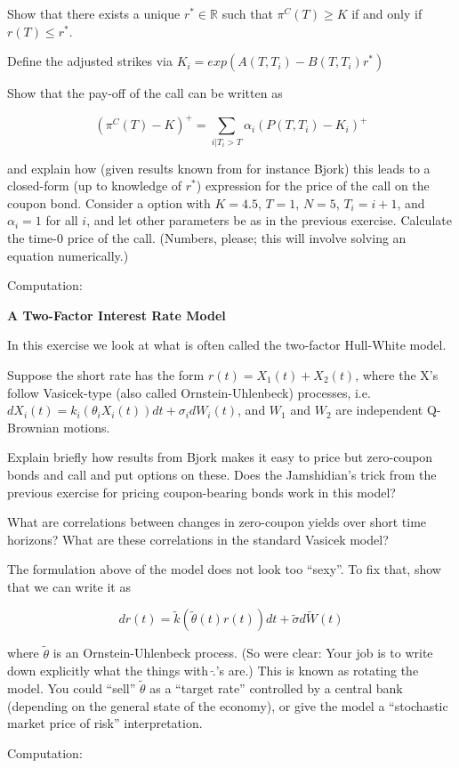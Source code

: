 \documentclass[a4paper]{article}
\begin{document}
Show that there exists a unique $r^{\ast} \in\mathbb{R}$ such that $\pi^{C}\left(T\right)\geq K$ if and only if $r\left(T\right)\leq r^{\ast}$.

Define the adjusted strikes via $K_i = exp\left(A\left(T, T_i\right)-B\left(T, T_i\right)r^{\ast}\right)$

Show that the pay-off of the call can be written as 

$$\left(\pi^{C}\left(T\right)-K\right)^{+}=\sum_{i|T_i > T}\alpha_i\left(P\left(T,T_i\right)-K_i\right)^{+}$$

and explain how (given results known from for instance Bjork) this leads to a closed-form (up to knowledge of $r^{\ast}$) expression for the price of the call on the coupon bond.
Consider a option with $K = 4.5$, $T = 1$, $N = 5$, $T_i = i+1$, and $\alpha_i = 1$ for all $i$, and let other parameters be as in the previous exercise. Calculate the time-0 price of the call. (Numbers, please; this will involve solving an equation numerically.)

\vspace{0.2cm}
Computation:

\vspace{0.4cm}
{\Large{\textbf{A Two-Factor Interest Rate Model}}}\\
\vspace{0.2cm}

In this exercise we look at what is often called the two-factor Hull-White model.


Suppose the short rate has the form $r(t) = X_1\left(t\right)+X_2\left(t\right)$, where the X's follow Vasicek-type (also called Ornstein-Uhlenbeck) processes, i.e. $dX_{i}\left(t\right) = k_i\left(\theta_i X_i\left(t\right)\right)dt + \sigma_i dW_{i}\left(t\right)$, and $W_{1}$ and $W_{2}$ are independent Q-Brownian motions.


Explain briefly how results from Bjork makes it easy to price but zero-coupon bonds and call and put options on these. Does the Jamshidian's trick from the previous exercise for pricing coupon-bearing bonds work in this model?

What are correlations between changes in zero-coupon yields over short time horizons? What are these correlations in the standard Vasicek model?


The formulation above of the model does not look too ``sexy''. To fix that, show that we can write it as

$$dr\left(t\right)=\tilde{k}\left(\tilde{\theta}\left(t\right)r\left(t\right)\right)dt+\tilde{\sigma}d\tilde{W}\left(t\right)$$

where $\tilde{\theta}$ is an Ornstein-Uhlenbeck process. (So were clear: Your job is to write down explicitly what the things with $\tilde{.}$'s are.) This is known as rotating the model. You could ``sell'' $\tilde{\theta}$ as a ``target rate'' controlled by a central bank (depending on the general state of the economy), or give the model a ``stochastic market price of risk'' interpretation.

\vspace{0.2cm}
Computation:
\end{document}
